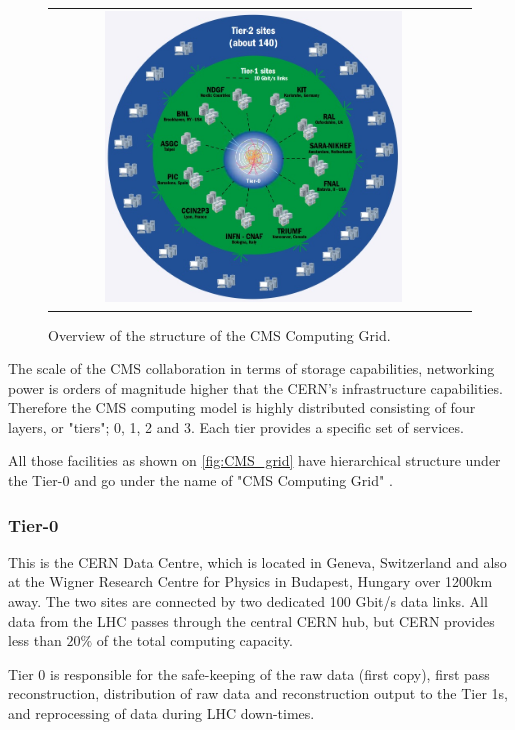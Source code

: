 \begin{figure}[tbh!]
	\centering
	\begin{tabular}{cc}
		\includegraphics[width=0.75\textwidth]{detector/pics/CMS_grid.jpg}
	\end{tabular}
	\caption{Overview of the structure of the CMS Computing Grid.}
	\label{fig:CMS_grid}
\end{figure}

The scale of the CMS collaboration in terms of storage capabilities, networking power is orders of magnitude higher that the CERN's infrastructure capabilities. Therefore the CMS computing model is highly distributed consisting of four layers, or "tiers"; 0, 1, 2 and 3. Each tier provides a specific set of services.

All those facilities as shown on \autoref{fig:CMS_grid} have hierarchical structure under the Tier-0 and go under the name of "CMS Computing Grid" \cite{Charlot:2003vy}.

\subsubsection{Tier-0}

This is the CERN Data Centre, which is located in Geneva, Switzerland and also at the Wigner Research Centre for Physics in Budapest, Hungary over 1200km away. The two sites are connected by two dedicated 100 Gbit/s data links. All data from the LHC passes through the central CERN hub, but CERN provides less than $20\%$ of the total computing capacity.

Tier 0 is responsible for the safe-keeping of the raw data (first copy), first pass reconstruction, distribution of raw data and reconstruction output to the Tier 1s, and reprocessing of data during LHC down-times.

